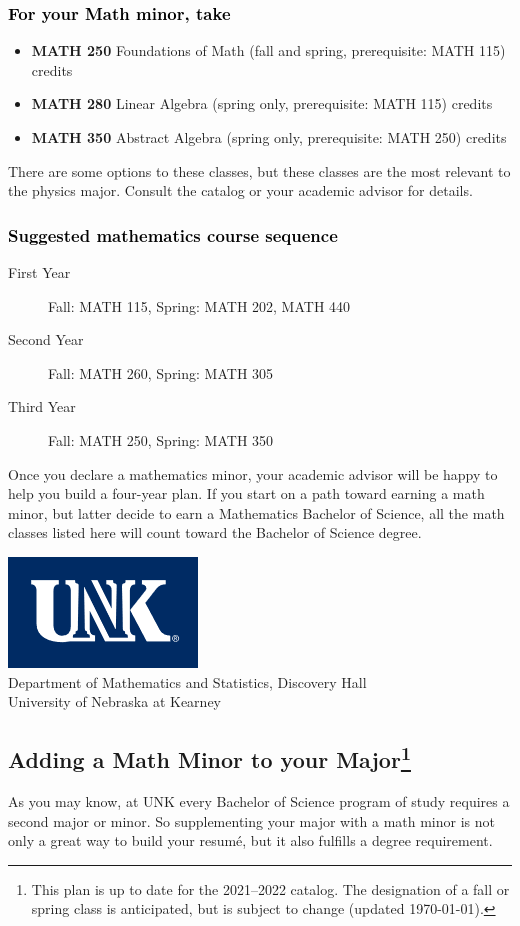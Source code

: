 \documentclass[10pt]{article}
\newcommand{\foundations}{\textbf{MATH 250} Foundations of Math (fall and spring, prerequisite: MATH 115)  \dotfill 3 credits}
\newcommand{\linear}{\textbf{MATH 280} Linear Algebra (spring only, prerequisite: MATH 115) \dotfill 3 credits}
\newcommand{\abstractalgebra}{\textbf{MATH 350}	Abstract Algebra (spring only, prerequisite: MATH 250) \dotfill 	3 credits}
\newcommand{\catalog}{2021--2022 }
\newcommand{\myfootnote}{\footnote{This plan is up to date for  the \catalog catalog. The designation of a fall or spring class is 
anticipated, but  is subject to change (updated  \today).}}
\newcommand{\myheading}{
\begin{flushleft}
\includegraphics[scale=0.35]{unk-logo}\\
\setcounter{footnote}{0}
\vspace{0.25in}
 \textcolor{unkblue}{Department of Mathematics and Statistics, Discovery Hall} \\
  \textcolor{unkblue}{University of Nebraska at Kearney}
\end{flushleft}}
\begin{document}
\subsubsection*{\textcolor{black}{For your Math minor, take}}
\begin{itemize}
\item \foundations
\item \linear
\item \abstractalgebra
\end{itemize}
There are some options to these classes, but these classes are the most relevant to the physics major. Consult the catalog or your academic
advisor for details.

\subsubsection*{\textcolor{black}{Suggested mathematics course sequence}}

\begin{description}
   \item[\phantom{xxx} First Year] Fall: MATH 115, Spring:  MATH 202, MATH 440
      \item[\phantom{xxx} Second Year]  Fall: MATH 260,  Spring: MATH 305
     \item[\phantom{xxx} Third Year]  Fall: MATH 250,  Spring: MATH 350
  \end{description}
  \vspace{0.1in}
  

 \noindent Once you declare a mathematics minor, your academic advisor will be happy to help you build a four-year plan. If you start on a path toward earning a math minor, but latter decide to earn a  Mathematics Bachelor of Science, all the math classes listed here will count toward the Bachelor of Science degree.




\newpage

\myheading

\subsection*{\textbf{\textcolor{unkblue}{Adding a Math Minor to your Major\myfootnote}}}

As you may know, at UNK every Bachelor of Science program of study requires a second
major or minor. So supplementing your major with a math minor is not only a great
way to build your resum\'e, but it also fulfills a degree requirement.
\end{document}
